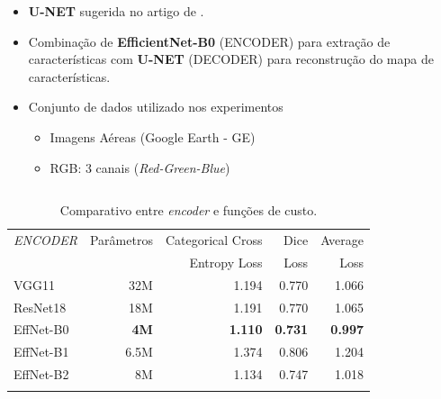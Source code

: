 \documentclass[%
  10pt,%
  aspectratio = 169,%
  compress,%
  t,%
  english,%
  brazilian,%
  tikz,
]{beamer}
\begin{document}
\begin{frame}

\begin{itemize}
    \item \textbf{U-NET} sugerida no artigo de \textcite{Nguyen-Khanh et al. (2021)}.
    \item Combinação de \textbf{EfficientNet-B0} \cite{EfficientNet} (ENCODER) para extração de características com \textbf{U-NET} \textcite{Ronneberger et al. (2015)} (DECODER) para reconstrução do mapa de características.
    \item Conjunto de dados utilizado nos experimentos
    \begin{itemize}
        \item Imagens Aéreas (Google Earth - GE)
        \item RGB: 3 canais (\textit{Red-Green-Blue})
    \end{itemize}
\end{itemize}

\begin{columns}[T]

\begin{table}[!htb]
\centering%
\caption{Comparativo entre \textit{encoder} e funções de custo.}%
\label{tab:met:unet}
\begin{tabular*}{\columnwidth}{@{\extracolsep{\fill}}lrrrr}
\toprule
\textit{ENCODER}    & Parâmetros    & Categorical Cross & Dice & Average    \\ 
                    &               & Entropy Loss      & Loss & Loss       \\
\midrule
VGG11       & 32M         & 1.194               & 0.770             & 1.066             \\
ResNet18    & 18M         & 1.191               & 0.770             & 1.065             \\
EffNet-B0   & \textbf{4M} & \textbf{1.110}      & \textbf{0.731}    & \textbf{0.997}    \\
EffNet-B1   & 6.5M        & 1.374               & 0.806             & 1.204             \\
EffNet-B2   & 8M          & 1.134               & 0.747             & 1.018             \\
\bottomrule
\addlinespace
\end{tabular*}
\end{table}

\end{columns}
\end{frame}
\end{document}
